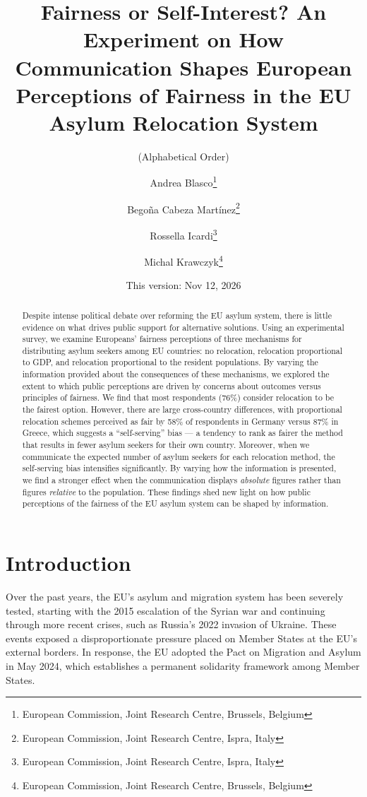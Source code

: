 \documentclass[
  12pt,
  a4paper,
]{article}
\title{Fairness or Self-Interest? An Experiment on How Communication Shapes European Perceptions of Fairness in the EU Asylum Relocation System}
\author{(Alphabetical Order) \and Andrea Blasco\footnote{European Commission, Joint Research Centre, Brussels, Belgium} \and Begoña Cabeza Martínez\footnote{European Commission, Joint Research Centre, Ispra, Italy} \and Rossella Icardi\footnote{European Commission, Joint Research Centre, Ispra, Italy} \and Michal Krawczyk\footnote{European Commission, Joint Research Centre, Brussels, Belgium}}
\date{This version: Nov 12, 2026}
\begin{document}
\maketitle
\begin{abstract}
Despite intense political debate over reforming the EU asylum system, there is little evidence on what drives public support for alternative solutions. Using an experimental survey, we examine Europeans' fairness perceptions of three mechanisms for distributing asylum seekers among EU countries: no relocation, relocation proportional to GDP, and relocation proportional to the resident populations. By varying the information provided about the consequences of these mechanisms, we explored the extent to which public perceptions are driven by concerns about outcomes versus principles of fairness. We find that most respondents (76\%) consider relocation to be the fairest option. However, there are large cross-country differences, with proportional relocation schemes perceived as fair by 58\% of respondents in Germany versus 87\% in Greece, which suggests a ``self-serving'' bias --- a tendency to rank as fairer the method that results in fewer asylum seekers for their own country. Moreover, when we communicate the expected number of asylum seekers for each relocation method, the self-serving bias intensifies significantly. By varying how the information is presented, we find a stronger effect when the communication displays \emph{absolute} figures rather than figures \emph{relative} to the population. These findings shed new light on how public perceptions of the fairness of the EU asylum system can be shaped by information.
\end{abstract}

\newpage

\section{Introduction}\label{introduction}

Over the past years, the EU's asylum and migration system has been severely tested, starting with the 2015 escalation of the Syrian war and continuing through more recent crises, such as Russia's 2022 invasion of Ukraine. These events exposed a disproportionate pressure placed on Member States at the EU's external borders. In response, the EU adopted the Pact on Migration and Asylum in May 2024, which establishes a permanent solidarity framework among Member States.
\end{document}
